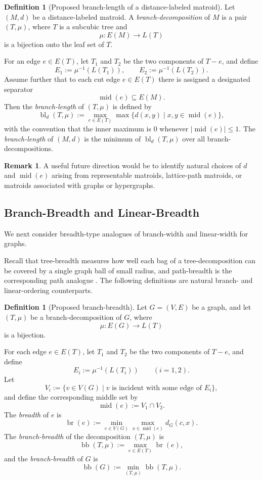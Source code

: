 \documentclass[10pt]{book}
\theoremstyle{definition}
\newtheorem{remark}[theorem]{Remark}
\newtheorem{definition}[theorem]{Definition}
\begin{document}
\begin{definition}[Proposed branch-length of a distance-labeled matroid]
Let \((M,d)\) be a distance-labeled matroid.
A \emph{branch-decomposition} of \(M\) is a pair \((T,\mu)\), where \(T\) is a subcubic tree and
\[
\mu:E(M)\to L(T)
\]
is a bijection onto the leaf set of \(T\).

For an edge \(e\in E(T)\), let \(T_1\) and \(T_2\) be the two components of \(T-e\), and define
\[
E_1:=\mu^{-1}(L(T_1)),
\qquad
E_2:=\mu^{-1}(L(T_2)).
\]
Assume further that to each cut edge \(e\in E(T)\) there is assigned a designated separator
\[
\operatorname{mid}(e)\subseteq E(M).
\]
Then the \emph{branch-length} of \((T,\mu)\) is defined by
\[
\operatorname{bl}_d(T,\mu):=
\max_{e\in E(T)}
\max\{d(x,y)\mid x,y\in \operatorname{mid}(e)\},
\]
with the convention that the inner maximum is \(0\) whenever \(|\operatorname{mid}(e)|\le 1\).
The \emph{branch-length} of \((M,d)\) is the minimum of \(\operatorname{bl}_d(T,\mu)\) over all branch-decompositions.
\end{definition}

\begin{remark}
A useful future direction would be to identify natural choices of \(d\) and \(\operatorname{mid}(e)\) arising from representable matroids, lattice-path matroids, or matroids associated with graphs or hypergraphs.
\end{remark}

\subsection{Branch-Breadth and Linear-Breadth}

We next consider breadth-type analogues of branch-width and linear-width for graphs.

Recall that tree-breadth measures how well each bag of a tree-decomposition can be covered by a single graph ball of small radius, and path-breadth is the corresponding path analogue \cite{leitert2016strong,leitert2017tree}.
The following definitions are natural branch- and linear-ordering counterparts.

\begin{definition}[Proposed branch-breadth]
Let \(G=(V,E)\) be a graph, and let \((T,\mu)\) be a branch-decomposition of \(G\), where
\[
\mu:E(G)\to L(T)
\]
is a bijection.

For each edge \(e\in E(T)\), let \(T_1\) and \(T_2\) be the two components of \(T-e\), and define
\[
E_i:=\mu^{-1}(L(T_i))
\qquad
(i=1,2).
\]
Let
\[
V_i:=\{v\in V(G)\mid v \text{ is incident with some edge of } E_i\},
\]
and define the corresponding middle set by
\[
\operatorname{mid}(e):=V_1\cap V_2.
\]
The \emph{breadth} of \(e\) is
\[
\operatorname{br}(e):=
\min_{c\in V(G)}
\max_{x\in \operatorname{mid}(e)} d_G(c,x).
\]
The \emph{branch-breadth} of the decomposition \((T,\mu)\) is
\[
\operatorname{bb}(T,\mu):=
\max_{e\in E(T)} \operatorname{br}(e),
\]
and the \emph{branch-breadth} of \(G\) is
\[
\operatorname{bb}(G):=
\min_{(T,\mu)} \operatorname{bb}(T,\mu).
\]
\end{definition}
\end{document}
